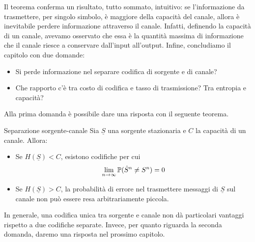 Il teorema conferma un risultato, tutto sommato, intuitivo: se l'informazione da trasmettere, per singolo simbolo, è maggiore della capacità del canale, allora è inevitabile perdere informazione attraverso il canale. Infatti, definendo la capacità di un canale, avevamo osservato che essa è la quantità massima di informazione che il canale riesce a conservare dall'input all'output. 
Infine, concludiamo il capitolo con due domande:
\begin{itemize}
  \item Si perde informazione nel separare codifica di sorgente e di canale?
  \item Che rapporto c'è tra costo di codifica e tasso di trasmissione? Tra entropia e capacità?
\end{itemize}

Alla prima domanda è possibile dare una risposta con il seguente teorema.

\begin{theorem}{Separazione sorgente-canale}
  Sia \(\underline{S}\) una sorgente stazionaria e \(C\) la capacità di un canale.
  Allora:
  \begin{itemize}
    \item Se \(H(\underline{S}) < C\), esistono codifiche per cui
      \[\lim_{n\to\infty} \Prob(\hat{S}^n \neq S^n) = 0\]
    \item Se \(H(\underline{S}) > C\), la probabilità di errore nel trasmettere messaggi di \(\underline{S}\) sul canale non può essere resa arbitrariamente piccola.
  \end{itemize}
\end{theorem}

In generale, una codifica unica tra sorgente e canale non dà particolari vantaggi rispetto a due codifiche separate.
Invece, per quanto riguarda la seconda domanda, daremo una risposta nel prossimo capitolo.